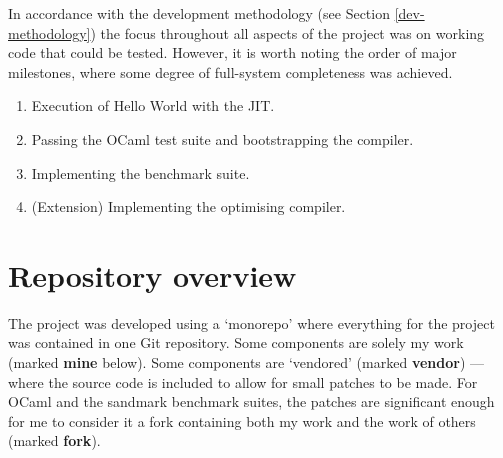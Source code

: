 In accordance with the development methodology (see Section \ref{dev-methodology}) the focus
throughout all aspects of the project was on working code that could be tested. However, it is
worth
noting the order of major milestones, where some degree of full-system completeness was achieved.

\begin{enumerate}
      \item Execution of Hello World with the JIT.
      \item Passing the OCaml test suite and bootstrapping the compiler.
      \item Implementing the benchmark suite.
      \item (Extension) Implementing the optimising compiler.
\end{enumerate}

\section{Repository overview}

The project was developed using a `monorepo' where everything for the project was contained in one
Git repository. Some components are solely my work (marked \textbf{mine} below). Some components
are `vendored' (marked \textbf{vendor}) --- where the source code is included to allow for small
patches to be made. For OCaml and the sandmark benchmark suites, the patches are significant enough
for me to consider it a fork containing both my work and the work of others (marked \textbf{fork}).


